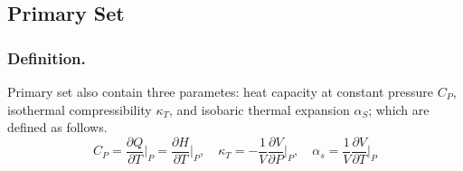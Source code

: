 \documentclass[../../../Main.tex]{subfiles}
\begin{document}
\subsection*{Primary Set}
\subsubsection*{Definition.} Primary set also contain three parametes: heat capacity at constant pressure $C_P$, isothermal compressibility $\kappa_T$, and isobaric thermal expansion $\alpha_S$; which are defined as follows.
\begin{equation*}
    C_P=\frac{\partial Q}{\partial T}\bigg|_P=\frac{\partial H}{\partial T}\bigg|_P,\quad 
    \kappa_T=-\frac{1}{V}\frac{\partial V}{\partial P}\bigg|_P,\quad
    \alpha_s=\frac{1}{V}\frac{\partial V}{\partial T}\bigg|_P
\end{equation*}
\end{document}
